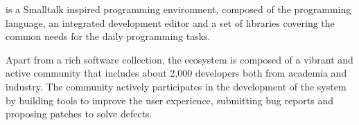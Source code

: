 \pha is a Smalltalk inspired programming environment, composed of the \pha programming language, an integrated development editor and a set of libraries covering the common needs for the daily programming tasks.

Apart from a rich software collection, the \pha ecosystem is composed of a vibrant and active community that includes about 2,000 developers both from academia and industry.
The community actively participates in the development of the system by building tools to improve the user experience, submitting bug reports and proposing patches to solve defects.

